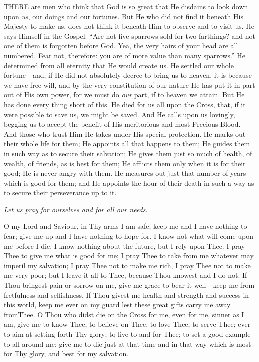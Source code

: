 
THERE are men who
think that God is so great that He disdains to look down upon \emph{us},
our doings and our fortunes. But He who did not find it beneath His
Majesty to make us, does not think it beneath Him to observe and to
visit us. He says Himself in the Gospel: ``Are not five sparrows sold for
two farthings? and not one of them is forgotten before God. Yea, the
very hairs of your head are all numbered. Fear not, therefore: you are
of more value than many sparrows.'' He determined from all eternity that
He would create us. He settled our whole fortune—and, if He did not
absolutely decree to bring us to heaven, it is because we have free
will, and by the very constitution of our nature He has put it in part
out of His own power, for we must do \emph{our} part, if to heaven we
attain. But He has done every thing short of this. He died for us all
upon the Cross, that, if it were possible to save us, we might be saved.
And He calls upon us lovingly, begging us to accept the benefit of His
meritorious and most Precious Blood. And those who trust Him He takes
under His special protection. He marks out their whole life for them; He
appoints all that happens to them; He guides them in such way as to
secure their salvation; He gives them just so much of health, of wealth,
of friends, as is best for them; He afflicts them only when it is
for their good; He is never angry with them. He measures out just that
number of years which is good for them; and He appoints the hour of
their death in such a way as to secure their perseverance up to it.

\emph{Let us pray}
\emph{for ourselves and for all our needs}.

O my Lord and Saviour, in Thy
arms I am safe; keep me and I have nothing to fear; give me up and I
have nothing to hope for. I know not what will come upon me before I
die. I know nothing about the future, but I rely upon Thee. I pray Thee
to give me what is good for me; I pray Thee to take from me whatever may
imperil my salvation; I pray Thee not to make me rich, I pray Thee not
to make me very poor; but I leave it all to Thee, because Thou knowest
and I do not. If Thou bringest pain or sorrow on me, give me grace to
bear it well—keep me from fretfulness and selfishness. If Thou givest
me health and strength and success in this world, keep me ever on my
guard lest these great gifts carry me away from\emph{}Thee. O Thou who
didst die on the Cross for me, even for me, sinner as I am, give me to
know Thee, to believe on Thee, to love Thee, to serve Thee; ever to aim
at setting forth Thy glory; to live to and for Thee; to set a good
example to all around me; give me to die just at that time and in that
way which is most for Thy glory, and best for my salvation.

